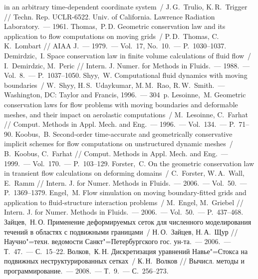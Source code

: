 \begin{thebibliography}{999}
                in an arbitrary time-dependent coordinate system~/ J.\,G.~Trulio, K.\,R.~Trigger // 
                Techn. Rep. UCLR-6522. Univ. of California. Lawrence Radiation Laboratory.~--- 1961.
%
\Eng
{}Thomas,~P.\,D. Geometric conservation law and its application to flow 
                computations on moving grids~/ P.\,D.~Thomas, C.\,K.~Lombart // AIAA J.~--- 
                1979.~--- Vol.~17, No.~10.~--- P.~1030--1037.
%
\Eng
{}Demirdzic,~I. Space conservation law in finite volume calculations of fluid 
                flow~/ I.~Demirdzic, M.~Peric // Intern. J. Numer. for Methods in 
                Fluids.~--- 1988.~--- Vol.~8.~--- P.~1037--1050.
%
\Eng
{} Shyy,~W. Computational fluid dynamics with moving boundaries~/ W.~Shyy, H.\,S.~Udaykumar, 
               M.\,M.~Rao, R.\,W.~Smith.~--- Washington, DC: Taylor and Francis, 1996.~--- 304~p.
%
\Eng
{}Lesoinne,~M. Geometric conservation laws for flow problems with moving boundaries and
                deformable meshes, and their impact on aerolastic computations~/ M.~Lesoinne, C.~Farhat // 
                Comput. Methods in Appl. Mech. and Eng.~--- 1996.~--- Vol.~134.~--- P.~71--90.
%
\Eng
{}Koobus,~B. Second-order time-accurate and geometrically conservative implicit 
                schemes for flow computations on unstructured dynamic meshes~/ B.~Koobus, C.~Farhat // 
                Comput. Methods in Appl. Mech. and Eng.~--- 1999.~--- Vol.~170.~--- P.~103--129.
%
\Eng
{} Forster,~C. On the geometric conservation law in transient flow calculations on deforming 
                domains~/ C.~Forster, W.\,A.~Wall, E.~Ramm // Intern. J. for Numer. Methods in Fluids.~--- 
                2006.~--- Vol.~50.~--- P.~1369--1379.
%
\Eng
{} Engel,~M. Flow simulation on moving boundary-fitted grids and application to 
                fluid-structure interaction problems~/ M.~Engel, M.~Griebel // Intern. J. for Numer. 
                Methods in Fluids.~--- 2006.~--- Vol.~50.~--- P.~437--468.
%
\Rus
{} Зайцев,~Н.\,О. Применение деформируемых сеток для численного моделирования течений 
                в областях с подвижными границами~/ Н.\,О.~Зайцев, Н.\,А.~Щур // Научно"=техн. ведомости 
                Санкт"=Петербургского гос. ун-та.~--- 2006.~--- Т.~47.~--- С.~15--22.
%
\Rus
{}Волков,~К.\,Н. Дискретизация уравнений Навье"=Стокса на подвижных неструктурированных 
                сетках~/ К.\,Н.~Волков // Вычисл. методы и программирование.~--- 2008.~--- Т.~9.~--- 
                С.~256--273.

\end{thebibliography}
